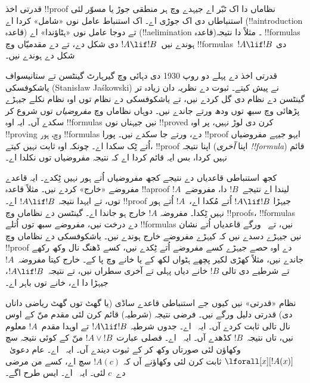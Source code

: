 \documentclass[../../../include/open-logic-section]{subfiles}
\begin{document}


قدرتی اخذ !!{proof} نظاماں دا اک ٹبّر اے جیہدے وچ ہر منطقی جوڑ یا مسوّر لئی استنباطاں دی اک جوڑی اے۔ اک استنباط عامل نوں «شامل» کردا اے (!!a{introduction} قاعدہ) تے دوجا عامل نوں «ہٹاؤندا» اے (!!a{elimination} قاعدہ)۔ مثلاً \Intro{\lif} دا نتیجہ !!{formula}s ہوندے نیں~$!A \lif !B$ دی شکل دے، تے \Elim{\lif} دے مقدمیّاں وچ !!{formula}s~$!A \lif !B$ دی شکل دے ہوندے نیں۔

قدرتی اخذ دے پہلے دو روپ 1930 دی دہائی وچ گیرہارٹ گینٹسن تے ستانیسواف یاشکوفسکی (Stanisław Jaśkowski) نے پیش کیتے۔ ثبوت دے نظریہ دان زیادہ تر گینٹسن دے نظام دی گل کردے نیں، تے یاشکوفسکی دے نظام توں اوہ نظام نکلے جیہڑے پڑھائی وچ سبھ توں ودھ ورتے جاندے نیں۔ دوہاں نظاماں وچ \emph{مفروضیاں} توں شروع کر سکدے آں۔ ایہ اوہ !!{formula}s نیں جیہناں نوں !!{prove}d کرن دی لوڑ نہیں، پر اوہ !!{proving} وچ، ہور !!{formula}s دے، ورتے جا سکدے نیں۔ پورا !!{proof} ایہو جیہے مفروضیاں اُتے ٹِک سکدا اے۔ چونکہ اوہ ثابت نہیں کیتے، !!{proof} اپنا نتیجہ (اپنا \emph{آخری !!{formula}}) قائم نہیں کردا، بس ایہ قائم کردا اے کہ نتیجہ مفروضیاں توں نکلدا اے۔

کجھ استنباطی قاعدیاں دے نتیجے کجھ مفروضیاں اُتے ہور نہیں ٹِکدے۔ ایہ قاعدے مفروضے «خارج» کردے نیں۔ مثلاً \Intro{\lif} قاعدہ !!a{proof} لیندا اے نتیجے~$!B$ دا، مفروضے~$!A$ توں، تے ایہدا نتیجہ $!A \lif !B$ اے۔ !!{proof} جیہڑا $!A \lif !B$ اُتے مُکدا اے،~$!A$ اُتے ہور نہیں ٹِکدا۔ مفروضہ $!A$ خارج ہو جاندا اے۔ گینٹسن دے نظاماں وچ !!{proof}s، !!{formula}s دے درخت نیں، مفروضے سبھ توں اُتلے !!{formula}s نیں، تے~\Intro{\lif} ورگے قاعدیاں اُتے نشان نیں جیہڑے دسدے نیں کہ کیہڑے مفروضے خارج ہوندے نیں۔ یاشکوفسکی دے نظاماں وچ !!{proof} دے اوہ حصے جیہڑے کسے مفروضے اُتے ٹِکدے نیں، کسے ڈھنگ نال وکھ رکھے جاندے نیں، مثلاً کھڑی لکیر پچھے ہٹواں لکھ کے یا خانے وچ پا کے۔ خارج کیتا مفروضہ~$!A$ تے شرطیے دی تالی $!B$ خانے دیاں پہلی تے آخری سطراں نیں، تے نتیجہ~$!A \lif !B$، جیہڑا \Intro{\lif} دا اے، خانے توں باہر اے۔

نظام «قدرتی» نیں کیوں جے استنباطی قاعدے ساڈی (یا گھٹ توں گھٹ ریاضی داناں دی) قدرتی دلیل ورگے نیں۔ فرضی نتیجہ (شرطیہ) قائم کرن لئی مقدم منّ کے اوس نال تالی ثابت کردے آں۔ ایہ~\Intro{\lif} اے۔ جدوں شرطیہ $!A \lif !B$ تے اوہدا مقدم~$!A$ معلوم نیں، تاں نتیجہ~$!B$ کڈھدے آں۔ ایہ~\Elim{\lif} اے۔ فصلی عبارت~$!A \lor !B$ منّ کے کوئی نتیجہ سچ وکھاؤن لئی صورتاں وکھ کر کے ثبوت دیندے آں۔ ایہ~\Elim{\lor} اے۔ عام دعویٰ~$\lforall[x][!A(x)]$ ثابت کرن لئی وکھاؤنے آں کہ $!A(c)$ سچ اے، کسے من مرضی دے~$c$ لئی۔ ایہ~\Intro{\lforall} اے۔ ایس طرح اگے۔
\end{document}
